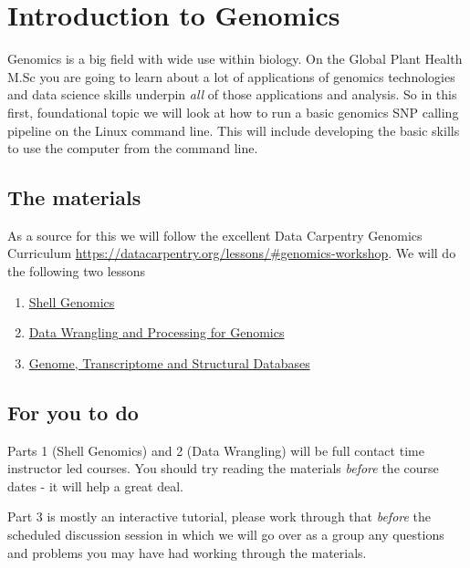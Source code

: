 \documentclass[
]{book}
\providecommand{\tightlist}{%
  \setlength{\itemsep}{0pt}\setlength{\parskip}{0pt}}
\begin{document}
\hypertarget{introduction-to-genomics}{%
\chapter{Introduction to Genomics}\label{introduction-to-genomics}}

Genomics is a big field with wide use within biology. On the Global Plant Health M.Sc you are going to learn about a lot of applications of genomics technologies and data science skills underpin \emph{all} of those applications and analysis. So in this first, foundational topic we will look at how to run a basic genomics SNP calling pipeline on the Linux command line. This will include developing the basic skills to use the computer from the command line.

\hypertarget{the-materials}{%
\section{The materials}\label{the-materials}}

As a source for this we will follow the excellent Data Carpentry Genomics Curriculum \url{https://datacarpentry.org/lessons/\#genomics-workshop}. We will do the following two lessons

\begin{enumerate}
\def\labelenumi{\arabic{enumi}.}
\tightlist
\item
  \href{https://datacarpentry.org/shell-genomics/}{Shell Genomics}
\item
  \href{https://datacarpentry.org/wrangling-genomics/}{Data Wrangling and Processing for Genomics}
\item
  \href{https://danmaclean.github.io/databases/}{Genome, Transcriptome and Structural Databases}
\end{enumerate}

\hypertarget{for-you-to-do}{%
\section{For you to do}\label{for-you-to-do}}

Parts 1 (Shell Genomics) and 2 (Data Wrangling) will be full contact time instructor led courses. You should try reading the materials \emph{before} the course dates - it will help a great deal.

Part 3 is mostly an interactive tutorial, please work through that \emph{before} the scheduled discussion session in which we will go over as a group any questions and problems you may have had working through the materials.
\end{document}
